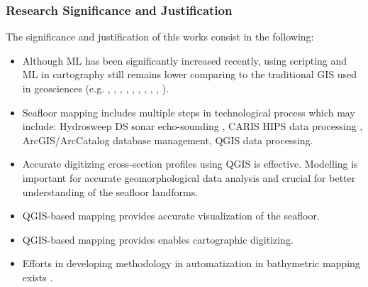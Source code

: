 \documentclass[pdflatex,compress,8pt,
	xcolor={dvipsnames,dvipsnames,svgnames,x11names,table},
	hyperref={colorlinks = true,breaklinks = true, urlcolor = NavyBlue, breaklinks = true}]{beamer}
\begin{document}
\begin{frame}\frametitle{Research Significance and Justification}
The significance and justification of this works consist in the following:

\begin{itemize}
         \item Although ML has been significantly increased recently, using scripting and ML in cartography still remains lower comparing to the traditional GIS used in geosciences (e.g. \cite{Lemenkova2005b2}, \cite{RID09251802355041}, \cite{RID:0925180235504-2}, \cite{Lemenkova2014d}, \cite{Lemenkova2011c}, \cite{Lemenkova2005a}, \cite{Lemenkova2012j}, \cite{Lemenkova2007c}, \cite{Lemenkova2012d}, \cite{Lemenkova2012g}). 
         \item Seafloor mapping includes multiple steps in technological process which may include: Hydrosweep DS sonar echo-sounding \cite{Lemenkova201569}, CARIS HIPS data processing \cite{Lemenkova2007f}, ArcGIS/ArcCatalog database management, QGIS data processing. 
	\item Accurate digitizing cross-section profiles using QGIS is effective. Modelling is important for accurate geomorphological data analysis and crucial for better understanding of the seafloor landforms. 
	\item QGIS-based mapping provides accurate visualization of the seafloor.
	\item QGIS-based mapping provides enables cartographic digitizing. 
	\item Efforts in developing methodology in automatization in bathymetric mapping exists \cite{Lemenkova2008b}. 
\end{itemize}

\end{frame}
\end{document}
